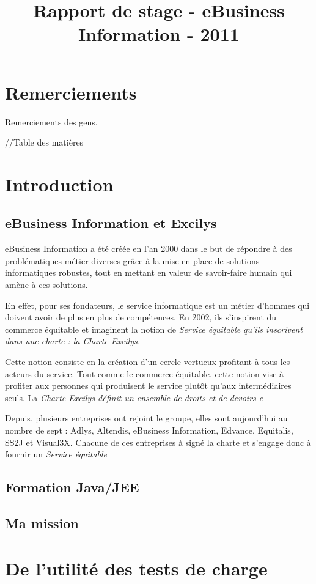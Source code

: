 \documentclass[12pt]{report}
\title{Rapport de stage - eBusiness Information - 2011}
\date{}
\begin{document}
  \chapter{Remerciements}
  Remerciements des gens.
  
  //Table des matières




  \chapter{Introduction}
  \section{eBusiness Information et Excilys}
  
  eBusiness Information a été créée en l'an 2000 dans le but de répondre à des problématiques métier diverses grâce à la mise en place de solutions informatiques robustes, tout en mettant en valeur de savoir-faire humain qui amène à ces solutions.
  
  En effet, pour ses fondateurs, le service informatique est un métier d'hommes qui doivent avoir de plus en plus de compétences. En 2002, ils s'inspirent du commerce équitable et imaginent la notion de \em{Service équitable} qu'ils inscrivent dans une charte : la \em{Charte Excilys}.
  
  Cette notion consiste en la création d'un cercle vertueux profitant à tous les acteurs du service. Tout comme le commerce équitable, cette notion vise à profiter aux personnes qui produisent le service plutôt qu'aux intermédiaires seuls.
  La \em{Charte Excilys} définit un ensemble de droits et de devoirs  e
  
  Depuis, plusieurs entreprises ont rejoint le groupe, elles sont aujourd'hui au nombre de sept : Adlys, Altendis, eBusiness Information, Edvance, Equitalis, SS2J et Visual3X. Chacune de ces entreprises à signé la charte et s'engage donc à fournir un \em{Service équitable}
  
  \section{Formation Java/JEE}
  \section{Ma mission}
  




  \chapter{De l'utilité des tests de charge}
\end{document}
